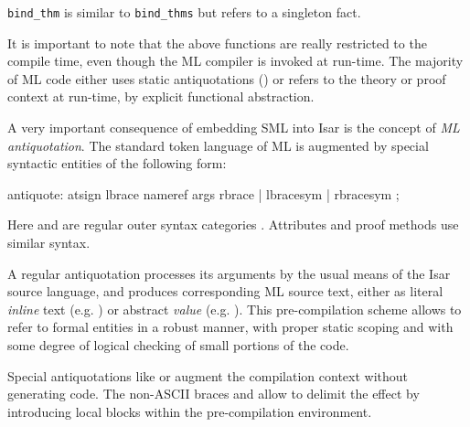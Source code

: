 \begin{isabellebody}
\begin{isamarkuptext}
\begin{description}
  \item \verb|bind_thm| is similar to \verb|bind_thms| but refers to a
  singleton fact.

  \end{description}

  It is important to note that the above functions are really
  restricted to the compile time, even though the ML compiler is
  invoked at run-time.  The majority of ML code either uses static
  antiquotations () or refers to the theory or
  proof context at run-time, by explicit functional abstraction.%
\end{isamarkuptext}%
\isamarkuptrue%
%
\endisatagmlref
{\isafoldmlref}%
%
\isadelimmlref
%
\endisadelimmlref
%
\isamarkuptrue%
%
\begin{isamarkuptext}%
A very important consequence of embedding SML into Isar is the
  concept of \emph{ML antiquotation}.  The standard token language of
  ML is augmented by special syntactic entities of the following form:

  \begin{rail}
  antiquote: atsign lbrace nameref args rbrace | lbracesym | rbracesym
  ;
  \end{rail}

  Here \hyperlink{syntax.nameref}{\mbox{}} and \hyperlink{syntax.args}{\mbox{}} are regular outer syntax
  categories \cite{isabelle-isar-ref}.  Attributes and proof methods
  use similar syntax.

  \medskip A regular antiquotation  processes
  its arguments by the usual means of the Isar source language, and
  produces corresponding ML source text, either as literal
  \emph{inline} text (e.g. ) or abstract
  \emph{value} (e.g. ).  This pre-compilation
  scheme allows to refer to formal entities in a robust manner, with
  proper static scoping and with some degree of logical checking of
  small portions of the code.

  Special antiquotations like  or  augment the compilation context without generating code.  The
  non-ASCII braces  and  allow to delimit the
  effect by introducing local blocks within the pre-compilation
  environment.


\end{isamarkuptext}
\end{isabellebody}
